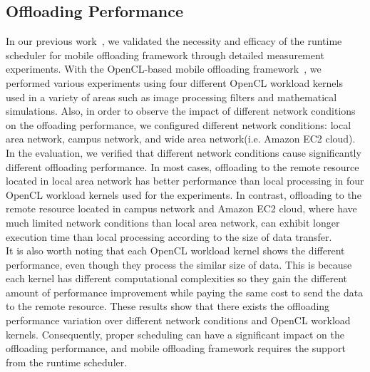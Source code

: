 \documentclass[10pt, conference, compsocconf]{IEEEtran}
\begin{document}
\subsection{Offloading Performance}
%
In our previous work~\cite{ml}, we validated the necessity and efficacy
of the runtime scheduler for mobile offloading framework through
detailed measurement experiments.
%
With the OpenCL-based mobile offloading framework~\cite{ocloff}, we
performed various experiments using four different OpenCL workload
kernels used in a variety of areas such as image processing filters and
mathematical simulations.
%
Also, in order to observe the impact of different network conditions on
the offoading performance, we configured different network conditions:
local area network, campus network, and wide area network(i.e. Amazon
EC2 cloud).
%
In the evaluation, we verified that different network conditions cause
significantly different offloading performance.
%
In most cases, offloading to the remote resource located in local area
network has better performance than local processing in four OpenCL
workload kernels used for the experiments.
%
In contrast, offloading to the remote resource located in campus network
and Amazon EC2 cloud, where have much limited network conditions than
local area network, can exhibit longer execution time than local
processing according to the size of data transfer.\\ 
%
\indent It is also worth noting that each OpenCL workload kernel shows
the different performance, even though they process the similar size of
data.
%
This is because each kernel has different computational complexities so
they gain the different amount of performance improvement while paying
the same cost to send the data to the remote resource.
%
These results show that there exists the offloading performance
variation over different network conditions and OpenCL workload kernels.
%
Consequently, proper scheduling can have a significant impact on the
offloading performance, and mobile offloading framework requires the
support from the runtime scheduler.
%
\end{document}
